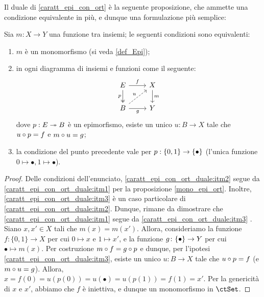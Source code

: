 Il duale di \ref{caratt_epi_con_ort} è la seguente proposizione, che ammette una condizione equivalente in più, e dunque una formulazione più semplice:
\begin{proposition}\label{caratt_epi_con_ort_duale}
	Sia \(m : X\to Y\) una funzione tra insiemi; le seguenti condizioni sono equivalenti:
	\begin{enumerate}
		\item\label{caratt_epi_con_ort_duale:itm1} \(m\) è un monomorfismo (si veda \ref{def_Epi});
		\item\label{caratt_epi_con_ort_duale:itm2} in ogni diagramma di insiemi e funzioni come il seguente:
		      \[\begin{tikzcd}
				      E \ar[r, "f"]\ar[d, two heads, "p"']& X \ar[d, "m"]\\
				      B \ar[r, "g"'] \ar[ur, dashed, "u"]& Y
			      \end{tikzcd}\]
		      dove \(p : E\twoheadrightarrow B\) è un epimorfismo, esiste un unico \(u : B\to X\) tale che \(u\circ p = f\) e \(m\circ u = g\);
		\item\label{caratt_epi_con_ort_duale:itm3} la condizione del punto precedente vale per \(p : \{0,1\} \to \{\bullet\}\) (l'unica funzione \(0\mapsto\bullet, 1\mapsto\bullet\)).
	\end{enumerate}
\end{proposition}
\begin{proof}
	Delle condizioni dell'enunciato, \ref{caratt_epi_con_ort_duale:itm2} segue da \ref{caratt_epi_con_ort_duale:itm1} per la proposizione \ref{mono_epi_ort}.
	Inoltre, \ref{caratt_epi_con_ort_duale:itm3} \`e un caso particolare di \ref{caratt_epi_con_ort_duale:itm2}.
	Dunque, rimane da dimostrare che \ref{caratt_epi_con_ort_duale:itm1} segue da \ref{caratt_epi_con_ort_duale:itm3} .
	Siano \(x, x' \in X\) tali che \(m(x) = m(x')\).
	Allora, consideriamo la funzione \(f \colon \{0, 1\} \to X\) per cui \(0 \mapsto x\) e \(1 \mapsto x'\),
	e la funzione \(g \colon \{\bullet\} \to Y\) per cui \(\bullet \mapsto m(x)\).
	Per costruzione \(m \circ f = g \circ p\) e dunque, per l'ipotesi \ref{caratt_epi_con_ort_duale:itm3}, esiste un unico \(u : B\to X\) tale che \(u\circ p = f\) (e \(m\circ u = g\)).
	Allora, \(x = f(0) = u(p(0)) = u(\bullet) = u(p(1)) = f(1) = x'\).
	Per la genericit\`a di \(x\) e \(x'\), abbiamo che \(f\) \`e iniettiva,
	e dunque un monomorfismo in \(\ctSet\).
\end{proof}
